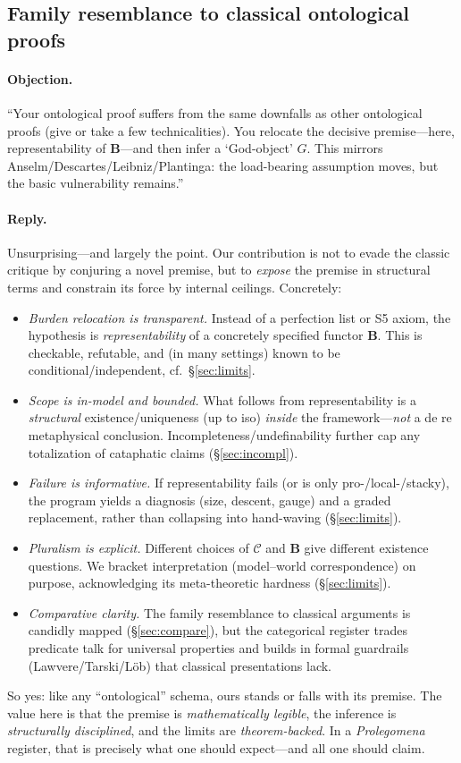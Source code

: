 \documentclass[11pt]{article}
\theoremstyle{upright}
\begin{document}
\subsection{Family resemblance to classical ontological proofs}
\paragraph{Objection.}
“Your ontological proof suffers from the same downfalls as other ontological proofs (give or take a few technicalities). You relocate the decisive premise—here, representability of \(\mathbf B\)—and then infer a `God-object' \(G\). This mirrors Anselm/Descartes/Leibniz/Plantinga: the load-bearing assumption moves, but the basic vulnerability remains.”

\paragraph{Reply.}
Unsurprising—and largely the point. Our contribution is not to evade the classic critique by conjuring a novel premise, but to \emph{expose} the premise in structural terms and constrain its force by internal ceilings. Concretely:
\begin{itemize}[leftmargin=2em]
  \item \emph{Burden relocation is transparent.} Instead of a perfection list or S5 axiom, the hypothesis is \emph{representability} of a concretely specified functor \(\mathbf B\). This is checkable, refutable, and (in many settings) known to be conditional/independent, cf.\ \S\ref{sec:limits}.
  \item \emph{Scope is in-model and bounded.} What follows from representability is a \emph{structural} existence/uniqueness (up to iso) \emph{inside} the framework—\emph{not} a de re metaphysical conclusion. Incompleteness/undefinability further cap any totalization of cataphatic claims (\S\ref{sec:incompl}).
  \item \emph{Failure is informative.} If representability fails (or is only pro-/local-/stacky), the program yields a diagnosis (size, descent, gauge) and a graded replacement, rather than collapsing into hand-waving (\S\ref{sec:limits}).
  \item \emph{Pluralism is explicit.} Different choices of \(\mathcal C\) and \(\mathbf B\) give different existence questions. We bracket interpretation (model–world correspondence) on purpose, acknowledging its meta-theoretic hardness (\S\ref{sec:limits}).
  \item \emph{Comparative clarity.} The family resemblance to classical arguments is candidly mapped (\S\ref{sec:compare}), but the categorical register trades predicate talk for universal properties and builds in formal guardrails (Lawvere/Tarski/Löb) that classical presentations lack.
\end{itemize}
So yes: like any “ontological” schema, ours stands or falls with its premise. The value here is that the premise is \emph{mathematically legible}, the inference is \emph{structurally disciplined}, and the limits are \emph{theorem-backed}. In a \emph{Prolegomena} register, that is precisely what one should expect—and all one should claim.
\end{document}
